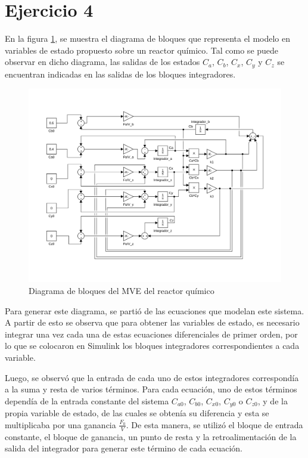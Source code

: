 \documentclass[12pt,letterpaper]{article}
\begin{document}
\section{Ejercicio 4}



En la figura \ref{fig:diag_bloques}, se muestra el diagrama de bloques que representa 
el modelo en variables de estado propuesto sobre un reactor químico. Tal como se puede 
observar en dicho diagrama, las salidas de los estados $C_a$, $C_b$, $C_x$, $C_y$ y $C_z$ se
encuentran indicadas en las salidas de los bloques integradores. 


\begin{figure}[ht!]
	\centering
	\includegraphics[width=1\textwidth]{pictures/Ejercicio4/diagrama_bloques_2}
	\caption{Diagrama de bloques del MVE del reactor químico}
	\label{fig:diag_bloques}
\end{figure} 



Para generar este diagrama, se partió de las ecuaciones que modelan este sistema. A partir
de esto se observa que para obtener las variables de estado, es necesario integrar una vez cada 
una de estas ecuaciones diferenciales de primer orden, por lo que se colocaron en Simulink los
bloques integradores correspondientes a cada variable.

Luego, se observó que la entrada de cada uno de estos integradores correspondía a la suma y resta de varios 
términos. Para cada ecuación, uno de estos términos dependía de la entrada constante del 
sistema $C_{a0}$, $C_{b0}$, $C_{x0}$, $C_{y0}$ o $C_{z0}$, y de la propia variable de estado, de las
cuales se obtenía su diferencia y esta se multiplicaba por una ganancia $\frac{F_0}{V}$. 
De esta manera, se utilizó el bloque de entrada constante, el bloque de ganancia, un punto de resta
y la retroalimentación de la salida del integrador para generar este término de cada ecuación.
\end{document}
